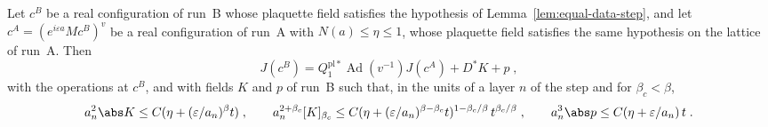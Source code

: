 
\begin{lemma}\label{lem:link-currents}
Let $c^B$ be a real configuration of run~B whose plaquette field satisfies the hypothesis of Lemma~\ref{lem:equal-data-step}, and let $c^A = (e^{i\varepsilon a}Mc^B)^v$ be a real configuration of run~A with $N(a) \leq \eta \leq 1$, whose plaquette field satisfies the same hypothesis on the lattice of run~A. Then
\[
    J(c^B) = Q^{\mathrm{pl}*}_1\operatorname{Ad}(v^{-1})J(c^A) + D^*K + p\;,
\]
with the operations at $c^B$, and with fields $K$ and $p$ of run~B such that, in the units of a layer $n$ of the step and for $\beta_c < \beta$,
\[
    a_n^2\abs K \leq C(\eta + (\varepsilon/a_n)^\beta t)\;,
    \qquad
    a_n^{2+\beta_c}[K]_{\beta_c} \leq C(\eta + (\varepsilon/a_n)^{\beta-\beta_c}t)^{1-\beta_c/\beta}\,t^{\beta_c/\beta}\;,
    \qquad
    a_n^3\abs p \leq C(\eta + \varepsilon/a_n)\,t\;.
\]
\end{lemma}


